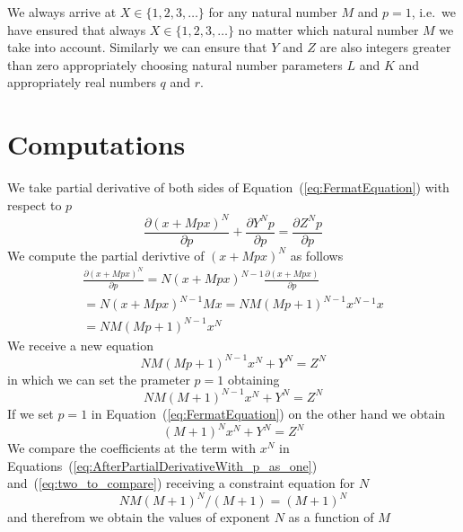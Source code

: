 \documentclass[SecEq,CM,GP]{degruyter-crelle} %
\theoremstyle{plain}
\theoremstyle{definition}
\begin{document}
We always arrive at $X \in \{1, 2, 3, \ldots \}$ for any natural number $M$ and $p=1$,
i.e.~we have ensured that always $X \in \{1, 2, 3, \ldots \}$ no matter which natural number $M$ we take
into account. Similarly we can ensure that $Y$ and $Z$ are also integers greater than zero
appropriately choosing natural number parameters $L$ and $K$ and appropriately real numbers $q$ and $r$\@.


\section{Computations}\label{sec:computations}

We take partial derivative of both sides of Equation~(\ref{eq:FermatEquation}) with respect to $p$ 
\begin{equation}
\label{eq:FermatEquationTakingDerivative}
\frac{\partial (x + Mpx)^N}{\partial p} + \frac{\partial Y^N p}{\partial p} = \frac{\partial Z^N p}{\partial p}
\end{equation}
We compute the partial derivtive of $(x + Mpx)^N$ as follows
\begin{eqnarray}
\frac{\partial (x + Mpx)^N}{\partial p}
=
N(x + Mpx)^{N-1}  \frac{\partial (x + Mpx)}{\partial p}   \\ \nonumber
=
N(x + Mpx)^{N-1} Mx 
=
NM  (Mp+1)^{N-1} x^{N-1}  x     \\  \nonumber
=
NM  (Mp+1)^{N-1}  x^N
\end{eqnarray}
We receive a new equation
\begin{equation}
NM  (Mp+1)^{N-1}  x^N + Y^{N} = Z^{N}
\end{equation}
in which we can set the prameter $p=1$ obtaining
\begin{equation}
\label{eq:AfterPartialDerivativeWith_p_as_one}
NM  (M+1)^{N-1}  x^N + Y^{N} = Z^{N}
\end{equation}
If we set $p=1$ in Equation~(\ref{eq:FermatEquation}) on the other hand we obtain
\begin{equation}
\label{eq:two_to_compare}
(M+1)^{N} x^{N} + Y^N  = Z^N
\end{equation}
We compare the coefficients at the term with $x^{N}$ in Equations~(\ref{eq:AfterPartialDerivativeWith_p_as_one}) 
and~(\ref{eq:two_to_compare})
receiving a constraint equation for $N$
\begin{equation}
\label{eq:constraint_for_N}
NM(M+1)^{N}/(M+1) = (M+1)^{N}
\end{equation}
and therefrom we obtain the values of exponent $N$ as a function of $M$
\end{document}
